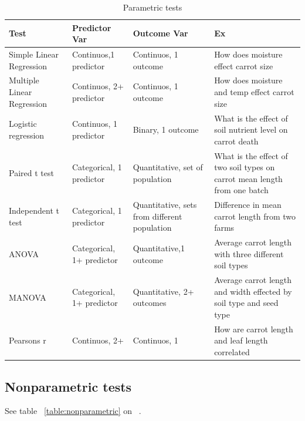 \documentclass[11pt]{scrartcl} %
\begin{document}
\begin{table}[h] %
	\centering %
	\begin{tabular}{P{2.5cm} P{2.5cm} P{2.5cm} P{2.5cm}}
		\toprule
		\textbf{Test} & \textbf{Predictor Var} & \textbf{Outcome Var} & \textbf{Ex} \\
		\midrule
		Simple Linear Regression & Continuos,1 predictor & Continuos, 1 outcome & How does moisture effect carrot size\\
		\midrule
		Multiple Linear Regression & Continuos, 2+ predictor & Continuos, 1 outcome & How does moisture and temp effect carrot size\\
		\midrule
		Logistic regression & Continuos, 1 predictor & Binary, 1 outcome & What is the effect of soil nutrient level on carrot death \\
		\midrule
		Paired t test & Categorical, 1 predictor & Quantitative, set of population & What is the effect of two soil types on carrot mean length from one batch\\ 
		\midrule
		Independent t test & Categorical, 1 predictor & Quantitative, sets from different population & Difference in mean carrot length from two farms\\
		\midrule
		ANOVA & Categorical, 1+ predictor & Quantitative,1 outcome & Average carrot length with three different soil types\\
		\midrule
		MANOVA & Categorical, 1+ predictor & Quantitative, 2+ outcomes & Average carrot length and width effected by soil type and seed type\\
		\midrule
		Pearsons r & Continuos, 2+ & Continuos, 1 & How are carrot length and leaf length correlated \\
		\bottomrule
	\end{tabular}
	\caption{Parametric tests}
	\label{table:parametric}
\end{table}

\subsection{Nonparametric tests}

See table ~\ref{table:nonparametric} on ~\pageref{table:nonparametric}.
\end{document}

